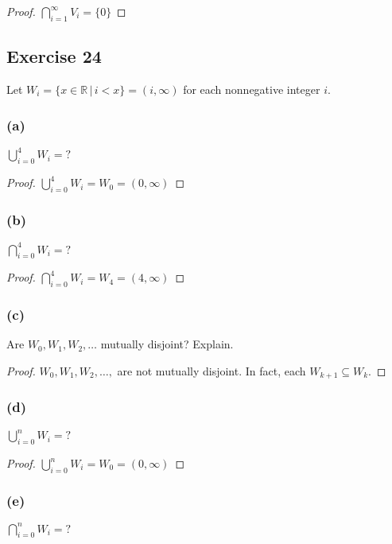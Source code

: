 \documentclass[14pt]{extarticle}
\newcommand{\dps}{\displaystyle}
\newcommand{\R}{\mathbb{R}}
\begin{document}
\begin{proof}
  \(\dps \bigcap_{i=1}^{\infty}V_i = \{0\}\)
\end{proof}

\subsection{Exercise 24}
Let \(W_i = \{x \in \R \,|\, i < x\} = (i, \infty)\) for each nonnegative integer $i$.

\subsubsection{(a)}
\(\dps \bigcup_{i=0}^{4}W_i = ?\)

\begin{proof}
  \(\dps \bigcup_{i=0}^{4}W_i = W_0 = (0, \infty)\)
\end{proof}

\subsubsection{(b)}
\(\dps \bigcap_{i=0}^{4}W_i = ?\)

\begin{proof}
  \(\dps \bigcap_{i=0}^{4}W_i = W_4 = (4, \infty)\)
\end{proof}

\subsubsection{(c)}
Are \(W_0, W_1, W_2, \ldots\) mutually disjoint? Explain.

\begin{proof}
  $W_0, W_1, W_2, \ldots,$ are not mutually disjoint. In fact, each \(W_{k+1} \subseteq W_k\).
\end{proof}

\subsubsection{(d)}
\(\dps \bigcup_{i=0}^{n}W_i = ?\)

\begin{proof}
  \(\dps \bigcup_{i=0}^{n}W_i = W_0 = (0, \infty)\)
\end{proof}

\subsubsection{(e)}
\(\dps \bigcap_{i=0}^{n}W_i = ?\)
\end{document}
